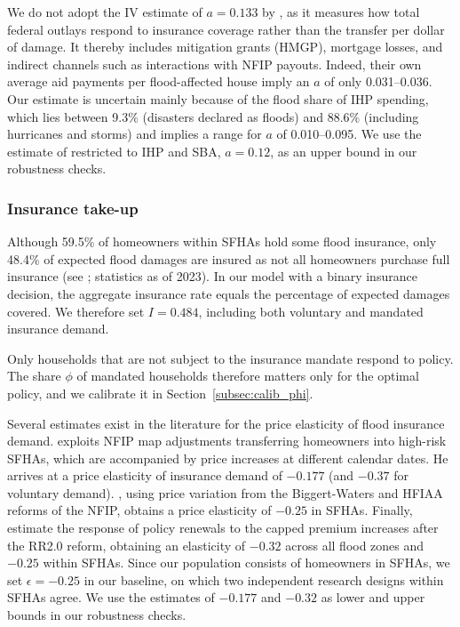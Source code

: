 \documentclass[12pt]{article}
\begin{document}
We do not adopt the IV estimate of $a=0.133$ by \cite{gruber2026optimal}, as it measures how total federal outlays respond to insurance coverage rather than the transfer per dollar of damage. It thereby includes mitigation grants (HMGP), mortgage losses, and indirect channels such as interactions with NFIP payouts. Indeed, their own average aid payments per flood-affected house imply an $a$ of only 0.031--0.036. Our estimate is uncertain mainly because of the flood share of IHP spending, which lies between 9.3$\%$ (disasters declared as floods) and 88.6$\%$ (including hurricanes and storms) and implies a range for $a$ of 0.010--0.095. We use the estimate of \cite{gruber2026optimal} restricted to IHP and SBA, $a=0.12$, as an upper bound in our robustness checks.

\subsubsection{Insurance take-up}
Although 59.5\% of homeowners within SFHAs hold some flood insurance, only 48.4\% of expected flood damages are insured as not all homeowners purchase full insurance (see \cite{amornsiripanitch2025measuring}; statistics as of 2023). In our model with a binary insurance decision, the aggregate insurance rate equals the percentage of expected damages covered. We therefore set $I=0.484$, including both voluntary and mandated insurance demand. 

Only households that are not subject to the insurance mandate respond to policy. The share $\phi$ of mandated households therefore matters only for the optimal policy, and we calibrate it in Section~\ref{subsec:calib_phi}.    

Several estimates exist in the literature for the price elasticity of flood insurance demand. \cite{mulder2024mismeasuring} exploits NFIP map adjustments transferring homeowners into high-risk SFHAs, which are accompanied by price increases at different calendar dates. He arrives at a price elasticity of insurance demand of $-0.177$ (and $-0.37$ for voluntary demand). \cite{wagner2022adaptation}, using price variation from the Biggert-Waters and HFIAA reforms of the NFIP, obtains a price elasticity of $-0.25$ in SFHAs. Finally, \cite{gruber2026optimal} estimate the response of policy renewals to the capped premium increases after the RR2.0 reform, obtaining an elasticity of $-0.32$ across all flood zones and $-0.25$ within SFHAs. Since our population consists of homeowners in SFHAs, we set $\epsilon=-0.25$ in our baseline, on which two independent research designs within SFHAs agree. We use the estimates of $-0.177$ and $-0.32$ as lower and upper bounds in our robustness checks.         
\end{document}
